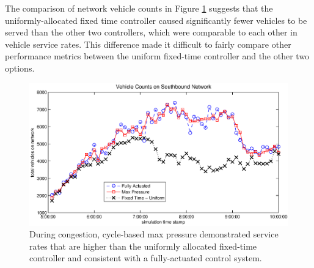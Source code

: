 The comparison of network vehicle counts in Figure \ref{fig_counts} suggests that the uniformly-allocated fixed time controller caused significantly fewer vehicles to be served than the other two controllers, which were comparable to each other in vehicle service rates. This difference made it difficult to fairly compare other performance metrics between the uniform fixed-time controller and the other two options. 
\begin{figure}[h!]
\centering
\includegraphics[width=\columnwidth]{./VehicleCountsPlot.eps}
\vspace{-2em}
\caption{During congestion, cycle-based max pressure demonstrated service rates that are higher than the uniformly allocated fixed-time controller and consistent with a fully-actuated control system.  \label{fig_counts}}
\end{figure}
